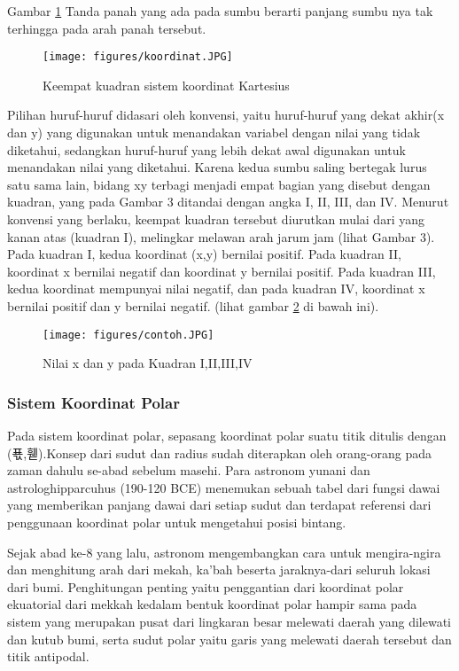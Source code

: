 Gambar \ref{koordinat} Tanda panah yang ada pada sumbu berarti panjang sumbu nya tak terhingga pada arah panah tersebut.

\begin{figure}[ht]
    \centerline{\texttt{[image: figures/koordinat.JPG]}}
    \caption{Keempat kuadran sistem koordinat Kartesius}
    \label{koordinat}
    \end{figure}

Pilihan huruf-huruf didasari oleh konvensi, yaitu huruf-huruf yang dekat akhir(x dan y) yang digunakan untuk menandakan variabel dengan nilai yang tidak diketahui, sedangkan huruf-huruf yang lebih dekat awal digunakan untuk menandakan nilai yang diketahui. Karena kedua sumbu saling bertegak lurus satu sama lain, bidang xy terbagi menjadi empat bagian yang disebut dengan kuadran, yang pada Gambar 3 ditandai dengan angka I, II, III, dan IV. Menurut konvensi yang berlaku, keempat kuadran tersebut diurutkan mulai dari yang kanan atas (kuadran I), melingkar melawan arah jarum jam (lihat Gambar 3). Pada kuadran I, kedua koordinat (x,y) bernilai positif. Pada kuadran II, koordinat x bernilai negatif dan koordinat y bernilai positif. Pada kuadran III, kedua koordinat mempunyai nilai negatif, dan pada kuadran IV, koordinat x bernilai positif dan y bernilai negatif. (lihat gambar \ref{contoh} di bawah ini).

\begin{figure}[ht]
    \centerline{\texttt{[image: figures/contoh.JPG]}}
    \caption{Nilai x dan y pada Kuadran I,II,III,IV}
    \label{contoh}
    \end{figure}

\subsubsection{Sistem Koordinat Polar}

Pada sistem koordinat polar, sepasang koordinat polar suatu titik ditulis dengan (푟,휃)\cite{mufidah2015solusi}.Konsep dari sudut dan radius sudah diterapkan oleh orang-orang pada zaman dahulu se-abad sebelum masehi. Para astronom yunani dan astrologhipparcuhus (190-120 BCE) menemukan sebuah tabel dari fungsi dawai yang memberikan panjang dawai dari setiap sudut dan terdapat referensi dari penggunaan koordinat polar untuk mengetahui posisi bintang.


Sejak abad ke-8 yang lalu, astronom mengembangkan cara untuk mengira-ngira dan menghitung arah dari mekah, ka'bah beserta jaraknya-dari seluruh lokasi dari bumi. Penghitungan penting yaitu penggantian dari koordinat polar ekuatorial dari mekkah kedalam bentuk koordinat polar hampir sama pada sistem yang merupakan pusat dari lingkaran besar melewati daerah yang dilewati dan kutub bumi, serta sudut polar yaitu garis yang melewati daerah tersebut dan titik antipodal.

